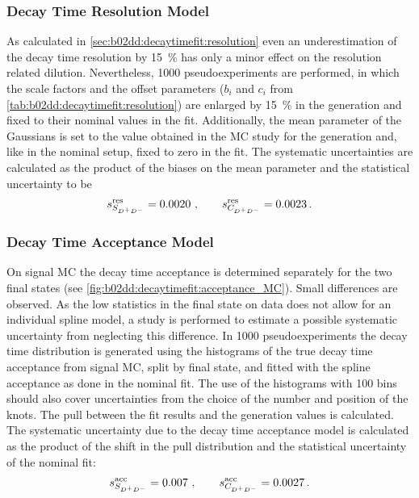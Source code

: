 \subsubsection{Decay Time Resolution Model}
\label{sec:systematics:decaytimeresolution}

As calculated in \cref{sec:b02dd:decaytimefit:resolution} even an
underestimation of the decay time resolution by \SI{15}{\percent} has only a
minor effect on the resolution related dilution. Nevertheless, \num{1000}
pseudoexperiments are performed, in which the scale factors and the offset
parameters ($b_i$ and $c_i$ from \cref{tab:b02dd:decaytimefit:resolution}) are
enlarged by \SI{15}{\percent} in the generation and fixed to their nominal
values in the fit. Additionally, the mean parameter of the Gaussians is set to
the value obtained in the MC study for the generation and, like in the nominal
setup, fixed to zero in the fit. The systematic uncertainties are calculated
as the product of the biases on the mean parameter and the statistical
uncertainty to be
\begin{align*}
s_{S_{{{D}^+}{{D}^-}}}^{\text{res}} = \num{0.0020}\ , \qquad s_{C_{{{D}^+}{{D}^-}}}^{\text{res}} = \num{0.0023}\,.
\end{align*}

\subsubsection{Decay Time Acceptance Model}
\label{sec:systematics:decaytimeacceptance}

On signal MC the decay time acceptance is determined separately for the two
final states (see \cref{fig:b02dd:decaytimefit:acceptance_MC}). Small
differences are observed. As the low statistics in the \KKpiKpipi final state
on data does not allow for an individual spline model, a study is performed to
estimate a possible systematic uncertainty from neglecting this difference. In
\num{1000} pseudoexperiments the decay time distribution is generated using
the histograms of the true decay time acceptance from signal MC, split by
final state, and fitted with the spline acceptance as done in the nominal fit.
The use of the histograms with \num{100} bins should also cover uncertainties
from the choice of the number and position of the knots. The pull between the
fit results and the generation values is calculated. The systematic
uncertainty due to the decay time acceptance model is calculated as the
product of the shift in the pull distribution and the statistical uncertainty
of the nominal fit:
\begin{align*}
s_{S_{{{D}^+}{{D}^-}}}^{\textrm{acc}} = \num{0.007}\ , \qquad s_{C_{{{D}^+}{{D}^-}}}^{\textrm{acc}} = \num{0.0027}\,.
\end{align*}
